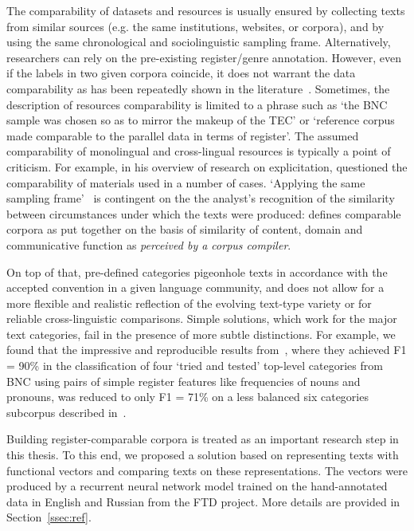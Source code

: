 The comparability of datasets and resources is usually ensured by collecting texts from similar sources (e.g. the same institutions, websites, or corpora), and by using the same chronological and sociolinguistic sampling frame. 
Alternatively, researchers can rely on the pre-existing register/genre annotation. However, even if the labels in two given corpora coincide, it does not warrant the data comparability as has been repeatedly shown in the literature~\cite{Sharoff2018, Delaere2015}. %
Sometimes, the description of resources comparability is limited to a phrase such as `the BNC sample was chosen so as to mirror the makeup of the TEC' or `reference corpus made comparable to the parallel data in terms of register'. The assumed comparability of monolingual and cross-lingual resources is typically a point of criticism. For example, in his overview of research on explicitation, \citet{Becher2011} questioned the comparability of materials used in a number of cases. 
`Applying the same sampling frame'~\cite{McEnery2007} is contingent on the the analyst's recognition of the similarity between circumstances under which the texts were produced: \citet{Zanettin1998} defines comparable corpora as put together on the basis of similarity of content, domain and communicative function as \textit{perceived by a corpus compiler}.

On top of that, pre-defined categories pigeonhole texts in accordance with the accepted convention in a given language community, and does not allow for a more flexible and realistic reflection of the evolving text-type variety or for reliable cross-linguistic comparisons. Simple solutions, which work for the major text categories, fail in the presence of more subtle distinctions. For example, we found that the impressive and reproducible results from~\citet{Lijffijt2017}, where they achieved F1 = 90\% in the classification of four `tried and tested' top-level categories from \gls{BNC} using pairs of simple register features like frequencies of nouns and pronouns, was reduced to only F1 = 71\% on a less balanced six categories subcorpus described in~\citet{Kunilovskaya2019similar}.

Building register-comparable corpora is treated as an important research step in this thesis. To this end, we proposed a solution based on representing texts with functional vectors and comparing texts on these representations. The vectors were produced by a recurrent neural network model trained on the hand-annotated data in English and Russian from the \gls{FTD} project. More details are provided in Section~\ref{ssec:ref}.

